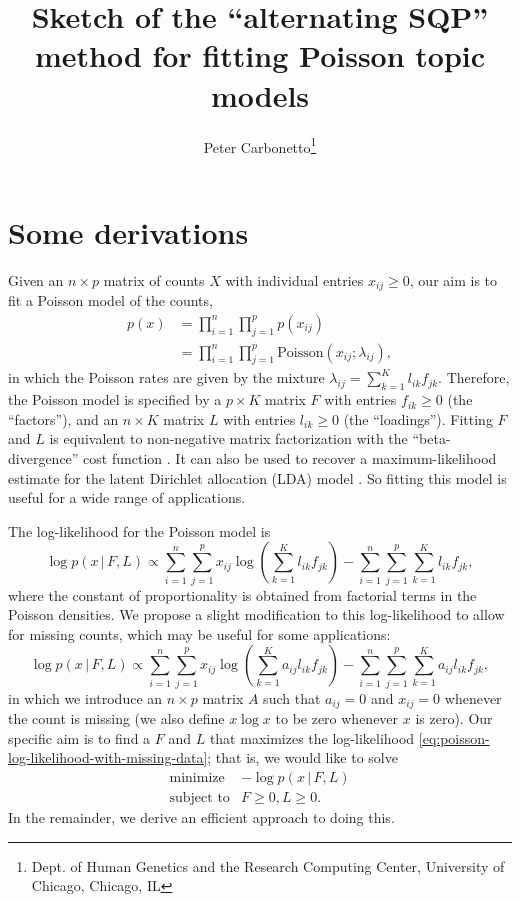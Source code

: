 \documentclass[final]{siamart171218}
\title{Sketch of the ``alternating SQP'' method for fitting Poisson
  topic models}
\author{Peter Carbonetto\thanks{Dept. of Human Genetics and the Research Computing Center, University of Chicago, Chicago, IL}}
\begin{document}
\maketitle

\section{Some derivations}

Given an $n \times p$ matrix of counts $X$ with individual entries
$x_{ij} \geq 0$, our aim is to fit a Poisson model of the counts,
\begin{align}
p(x) &= \prod_{i=1}^n \prod_{j=1}^p p(x_{ij}) \nonumber \\
     &= \prod_{i=1}^n \prod_{j=1}^p \mathrm{Poisson}(x_{ij}; \lambda_{ij}),
\label{eq:poisson-likelihood}
\end{align}
in which the Poisson rates are given by the mixture $\lambda_{ij} =
\sum_{k=1}^K l_{ik} f_{jk}$. Therefore, the Poisson model is specified
by a $p \times K$ matrix $F$ with entries $f_{ik} \geq 0$ (the
``factors''), and an $n \times K$ matrix $L$ with entries $l_{ik} \geq
0$ (the ``loadings''). Fitting $F$ and $L$ is equivalent to
non-negative matrix factorization with the ``beta-divergence'' cost
function \cite{lee-2001}. It can also be used to recover a
maximum-likelihood estimate for the latent Dirichlet allocation (LDA)
model \cite{blei-2003}. So fitting this model is useful for a wide
range of applications.

The log-likelihood for the Poisson model is
\begin{equation}
\log p(x \,|\, F, L) \propto
  \sum_{i=1}^n \sum_{j=1}^p x_{ij} \log
  ({\textstyle \sum_{k=1}^K l_{ik} f_{jk}})
    - \sum_{i=1}^n \sum_{j=1}^p \sum_{k=1}^K l_{ik} f_{jk},
\label{eq:poisson-log-likelihood}
\end{equation}
where the constant of proportionality is obtained from factorial terms
in the Poisson densities. We propose a slight modification to this
log-likelihood to allow for missing counts, which may be useful for
some applications:
\begin{equation}
\log p(x \,|\, F, L) \propto
  \sum_{i=1}^n \sum_{j=1}^p x_{ij} \log
  ({\textstyle \sum_{k=1}^K a_{ij} l_{ik} f_{jk}})
    - \sum_{i=1}^n \sum_{j=1}^p \sum_{k=1}^K a_{ij} l_{ik} f_{jk},
\label{eq:poisson-log-likelihood-with-missing-data}
\end{equation}
in which we introduce an $n \times p$ matrix $A$ such that $a_{ij} =
0$ and $x_{ij} = 0$ whenever the count is missing (we also define $x
\log x$ to be zero whenever $x$ is zero). Our specific aim is to find
a $F$ and $L$ that maximizes the log-likelihood
\eqref{eq:poisson-log-likelihood-with-missing-data}; that is, we would
like to solve
\begin{equation}
\begin{array}{ll}
\mbox{minimize} & -\log p(x \,|\, F, L) \\
\mbox{subject to} & F \geq 0, L \geq 0.
\end{array}
\label{eq:problem}
\end{equation}
In the remainder, we derive an efficient approach to
doing this.
\end{document}
